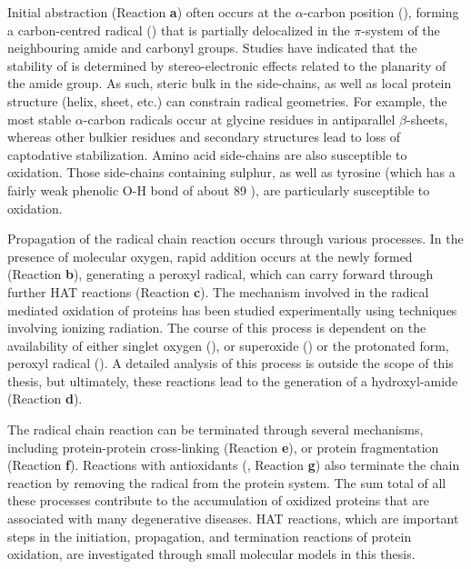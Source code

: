 \begin{doublespace}
Initial abstraction (Reaction \textbf{a}) often occurs at the $\alpha$-carbon
position (), forming a carbon-centred radical
() that is partially delocalized in the $\pi$-system of the
neighbouring amide and carbonyl groups. Studies have indicated that the
stability of  is determined by stereo-electronic effects
related to the planarity of the amide group.\cite{Salamone2014b} As such, steric
bulk in the side-chains, as well as local protein structure (helix, sheet, etc.)
can constrain radical geometries. For example, the most stable $\alpha$-carbon
radicals occur at glycine residues in antiparallel $\beta$-sheets, whereas other
bulkier residues and secondary structures lead to loss of captodative
stabilization.\cite{Rauk2000} Amino acid side-chains are also susceptible to
oxidation. Those side-chains containing sulphur,\cite{Stadtman2004} as well as
tyrosine (which has a fairly weak phenolic O-H bond of about 89
\kcalmol),\cite{Mulder2005} are particularly susceptible to oxidation.

Propagation of the radical chain reaction occurs through various processes. In
the presence of molecular oxygen, rapid addition occurs at the newly formed
 (Reaction \textbf{b}), generating a peroxyl radical, which can
carry forward through further HAT reactions (Reaction
\textbf{c}).\cite{Stadtman2003} The mechanism involved in the radical mediated
oxidation of proteins has been studied experimentally using techniques involving
ionizing radiation.\cite{Garrison1962,Garrison1987} The course of this process
is dependent on the availability of either singlet oxygen (), or
superoxide () or the protonated form, peroxyl radical ().
A detailed analysis of this process is outside the scope of this thesis, but
ultimately, these reactions lead to the generation of a hydroxyl-amide (Reaction
\textbf{d}).

The radical chain reaction can be terminated through several mechanisms,
including protein-protein cross-linking (Reaction \textbf{e}), or protein
fragmentation (Reaction \textbf{f}). Reactions with antioxidants (,
Reaction \textbf{g}) also terminate the chain reaction by removing the radical
from the protein system. The sum total of all these processes contribute to the
accumulation of oxidized proteins that are associated with many degenerative
diseases.\cite{Halliwell2006} HAT reactions, which are important steps in the
initiation, propagation, and termination reactions of protein oxidation, are
investigated through small molecular models in this thesis.


\end{doublespace}
